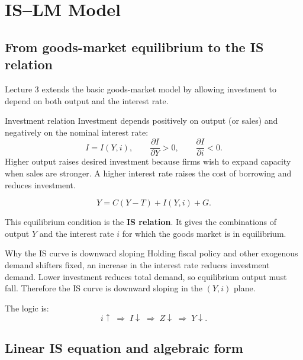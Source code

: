 
\section{IS--LM Model}

\subsection{From goods-market equilibrium to the IS relation}

Lecture 3 extends the basic goods-market model by allowing investment to depend on both output and the interest rate.

\begin{definition}{Investment relation}{}
Investment depends positively on output (or sales) and negatively on the nominal interest rate:
\[
I = I(Y,i),
\qquad
\frac{\partial I}{\partial Y}>0,
\qquad
\frac{\partial I}{\partial i}<0.
\]
Higher output raises desired investment because firms wish to expand capacity when sales are stronger. A higher interest rate raises the cost of borrowing and reduces investment.
\end{definition}

\begin{keyformula}[title={Key Formula: Goods-market equilibrium with interest-sensitive investment}]
\[
Y = C(Y-T) + I(Y,i) + G.
\]
\end{keyformula}

\noindent
This equilibrium condition is the \textbf{IS relation}. It gives the combinations of output $Y$ and the interest rate $i$ for which the goods market is in equilibrium.

\begin{theorem}{Why the IS curve is downward sloping}{}
Holding fiscal policy and other exogenous demand shifters fixed, an increase in the interest rate reduces investment demand. Lower investment reduces total demand, so equilibrium output must fall. Therefore the IS curve is downward sloping in the $(Y,i)$ plane.
\end{theorem}

\noindent
The logic is:
\[
i\uparrow \;\Rightarrow\; I\downarrow \;\Rightarrow\; Z\downarrow \;\Rightarrow\; Y\downarrow.
\]

\subsection{Linear IS equation and algebraic form}

